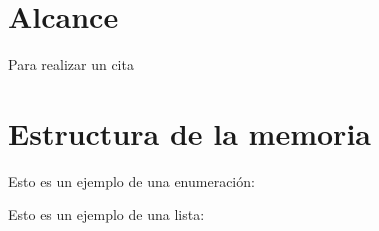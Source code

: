 \section{Alcance} \label{s1_2}

	\blindtext
	
	Para realizar un cita \citep{o2009wave}
\section{Estructura de la memoria} \label{s1_3}
 
	\blindtext
	
	Esto es un ejemplo de una enumeración:
	\blindenumerate[3]
	
	Esto es un ejemplo de una lista: 
	\blinditemize[3]